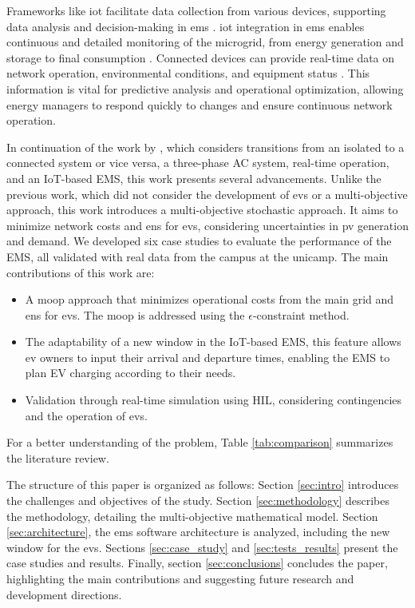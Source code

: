 \documentclass[preprint, 10pt, 5p]{elsarticle}
\begin{document}
Frameworks like \gls{iot} facilitate data collection from various devices, 
supporting data analysis and decision-making in \gls{ems} \cite{ullah2023,yehia2024}. 
\gls{iot} integration in \gls{ems} enables continuous and detailed monitoring of 
the microgrid, from energy generation and storage to final 
consumption \cite{pitchai2024}. Connected devices can provide real-time data 
on network operation, environmental conditions, and equipment 
status \cite{mansouri2023}. This information is vital for predictive 
analysis and operational optimization, allowing energy managers to respond 
quickly to changes and ensure continuous network operation.

In continuation of the work by \cite{silva2023}, which considers transitions 
from an isolated to a connected system or vice versa, a three-phase AC system, 
real-time operation, and an IoT-based EMS, this work presents several 
advancements. Unlike the previous work, which did not consider the development 
of \glspl{ev} or a multi-objective approach, this work introduces a 
multi-objective stochastic approach. It aims to minimize network costs and 
\gls{ens} for \glspl{ev}, considering uncertainties in \gls{pv} generation 
and demand. We developed six case studies to evaluate the performance of the 
EMS, all validated with real data from the \gls{campus} at the \gls{unicamp}.
The main contributions of this work 
are:

\begin{itemize}
    \item A \gls{moop} approach that minimizes operational costs from the main 
    grid and \gls{ens} for \glspl{ev}. The \gls{moop} is addressed using the 
    $\epsilon$-constraint method.

    \item The adaptability of a new window in the IoT-based EMS, this feature 
    allows \gls{ev} owners to input their arrival and departure times, 
    enabling the EMS to plan EV charging according to their needs.

    \item Validation through real-time simulation using HIL, considering 
    contingencies and the operation of \glspl{ev}.

\end{itemize} 

For a better understanding of the problem, Table 
\ref{tab:comparison} summarizes the literature review.

The structure of this paper is organized as follows: Section \ref{sec:intro} 
introduces the challenges and objectives of the study. 
Section \ref{sec:methodology} describes the methodology, detailing the 
multi-objective mathematical model. 
Section \ref{sec:architecture}, the \gls{ems} software architecture is analyzed, 
including the new window for the \glspl{ev}. Sections \ref{sec:case_study} and \ref{sec:tests_results} 
present the case studies and results. 
Finally, section \ref{sec:conclusions} concludes the paper, 
highlighting the main contributions and suggesting future research and 
development directions.
\end{document}
